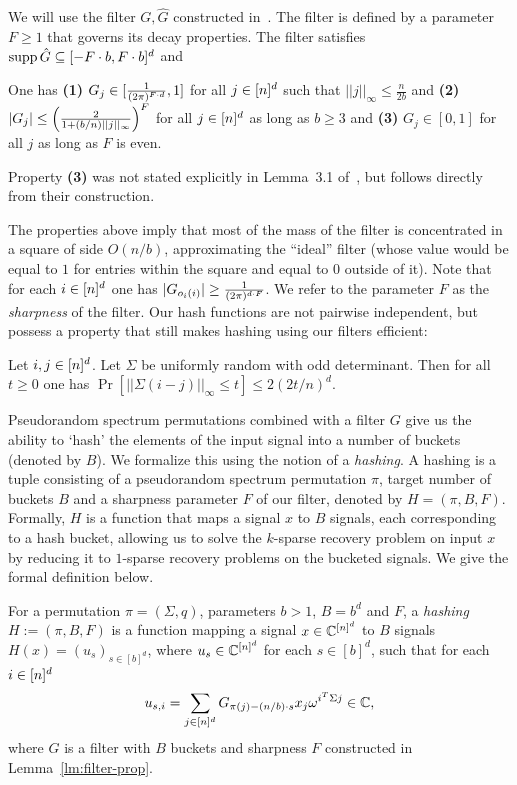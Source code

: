 We will use the filter $G, \hat G$ constructed in~\cite{IK14a}. The filter is defined by a parameter $F\geq 1$ that governs its decay properties. The filter satisfies  $\operatorname{supp} \hat G\subseteq [-F\cdot b, F\cdot b]^d$ and 
\begin{lemma}\label{lm:filter-prop}
One has {\bf (1)} $G_j\in [\frac1{(2\pi)^{F \cdot d}}, 1]$ for all $j\in {[n]^d}$ such that $||j||_\infty\leq \frac{n}{2b}$ and {\bf (2)} $|G_j|\leq \left(\frac2{1+(b/n)||j||_\infty}\right)^{F}$ for all $j\in {[n]^d}$
as long as $b\geq 3$ and {\bf (3)} $G_j\in [0, 1]$ for all $j$ as long as $F$ is even.
\end{lemma}
\begin{remark}
Property {\bf (3)} was not stated explicitly in Lemma~3.1 of~\cite{IK14a}, but follows directly from their construction.
\end{remark}
The properties above imply that most of the mass of the filter is concentrated in a square of side $O(n/b)$, approximating the ``ideal'' filter (whose value would be equal to $1$ for entries within the square and equal to $0$ outside of it). 
Note that for each $i\in {[n]^d}$ one has $|G_{o_i(i)}|\geq \frac1{(2\pi)^{d\cdot F}}$. We refer to the parameter $F$ as the {\em sharpness} of the filter. Our hash functions are not pairwise independent, but possess a property that still makes hashing using our filters efficient:
\begin{lemma}\label{lemma:limitedindependence}
Let $i, j\in {[n]^d}$. Let $\Sigma$ be uniformly random with odd determinant. Then for all $t\geq 0$ one has $
\Pr[||\Sigma(i-j)||_\infty \leq t] \leq 2(2t/n)^d$.
\end{lemma}

Pseudorandom spectrum permutations combined with a filter $G$ give us the ability to `hash' the elements of the input signal into a number of buckets (denoted by $B$). We formalize this using the notion of a {\em hashing}. A hashing is a tuple consisting of a pseudorandom spectrum permutation $\pi$, target number of buckets $B$ and a sharpness parameter $F$ of our filter, denoted by $H=(\pi, B, F)$. Formally, $H$ is a function that maps a signal $x$ to $B$ signals, each corresponding to a hash bucket, allowing us to solve the $k$-sparse recovery problem on input $x$ by reducing it to $1$-sparse recovery problems on the bucketed signals. We give the formal definition below.

\begin{definition}[Hashing $H=(\pi, B, F)$]
For a permutation $\pi=(\Sigma, q)$, parameters $b>1$, $B=b^d$ and $F$,  a {\em hashing} $H:=(\pi, B, F)$ is a function mapping a signal $x\in \mathbb{C}^{{[n]^d}}$ to $B$ signals $H(x)=(u_s)_{s\in [b]^d}$, where $u_s\in \mathbb{C}^{{[n]^d}}$ for each $s\in [b]^d$, such that for each $i\in {[n]^d}$
$$
  u_{s, i}  = \sum_{j\in {[n]^d}} G_{\pi(j)-(n/b)\cdot s}x_j \omega^{i^T \Sigma j}\in \mathbb{C},
$$
where $G$ is a filter with $B$ buckets and sharpness $F$ constructed in Lemma~\ref{lm:filter-prop}.
\end{definition}


